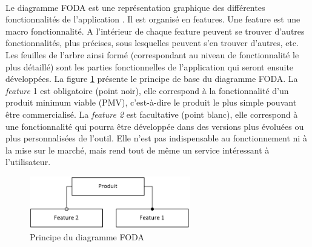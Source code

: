 			\paragraph{}%
			Le diagramme FODA est une représentation graphique des différentes
			fonctionnalités de l’application \citep{bontemps_semantics_2004}. Il est
			organisé en features.
			Une feature est une macro fonctionnalité. A l’intérieur de chaque feature
			peuvent se trouver d’autres fonctionnalités, plus précises, sous lesquelles
			peuvent s’en trouver d’autres, etc. Les feuilles de l’arbre ainsi formé
			(correspondant au niveau de fonctionnalité le plus détaillé) sont les parties
			fonctionnelles de l’application qui seront ensuite développées.\newline
			La figure \ref{foda_legende} présente le principe de base du diagramme FODA.
			La \textit{feature} 1 est obligatoire (point noir), elle correspond à la
			fonctionnalité d'un produit minimum viable (PMV), c'est-à-dire le produit le
			plus simple pouvant être commercialisé.
			La \textit{feature 2} est facultative (point blanc), elle correspond à une fonctionnalité qui pourra être
			développée dans des versions plus évoluées ou plus personnalisées de
			l’outil. Elle n’est pas indispensable au fonctionnement ni à la mise sur le
			marché, mais rend tout de même un service intéressant à l'utilisateur.
			\begin{figure}[H]%
				\centering
				\includegraphics[width=7cm]{../img/foda_legende.png}
				\caption{\label{foda_legende} Principe du diagramme FODA}
			\end{figure}
			
